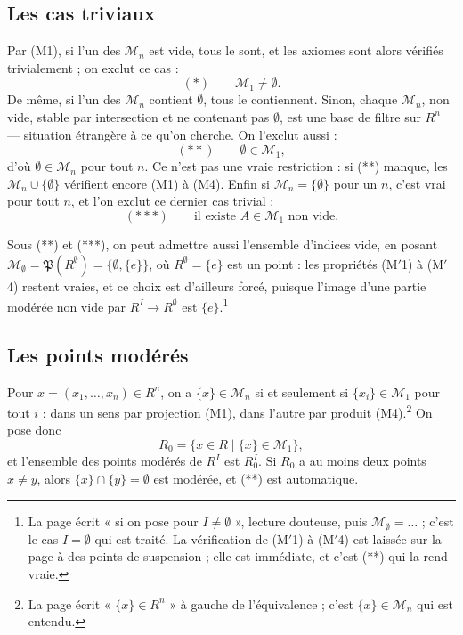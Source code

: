 \documentclass[11pt,a4paper]{article}
\begin{document}
\subsection*{Les cas triviaux}

Par (M1), si l'un des $\mathcal{M}_n$ est vide, tous le sont, et les axiomes
sont alors vérifiés trivialement ; on exclut ce cas :
\[ (*) \qquad \mathcal{M}_1 \neq \emptyset . \]
De même, si l'un des $\mathcal{M}_n$ contient $\emptyset$, tous le contiennent.
Sinon, chaque $\mathcal{M}_n$, non vide, stable par intersection et ne
contenant pas $\emptyset$, est une base de filtre sur $R^n$ — situation
étrangère à ce qu'on cherche. On l'exclut aussi :
\[ (**) \qquad \emptyset \in \mathcal{M}_1 , \]
d'où $\emptyset \in \mathcal{M}_n$ pour tout $n$. Ce n'est pas une vraie
restriction : si (**) manque, les $\mathcal{M}_n \cup \{\emptyset\}$ vérifient
encore (M1) à (M4). Enfin si $\mathcal{M}_n = \{\emptyset\}$ pour un $n$, c'est
vrai pour tout $n$, et l'on exclut ce dernier cas trivial :
\[ (***) \qquad \text{il existe } A \in \mathcal{M}_1 \text{ non vide.} \]

Sous (**) et (***), on peut admettre aussi l'ensemble d'indices vide, en posant
$\mathcal{M}_\emptyset = \mathfrak{P}(R^\emptyset) = \{\emptyset, \{e\}\}$, où
$R^\emptyset = \{e\}$ est un point : les propriétés (M$'$1) à (M$'$4) restent
vraies, et ce choix est d'ailleurs forcé, puisque l'image d'une partie
modérée non vide par $R^I \to R^\emptyset$ est $\{e\}$.\footnote{La page écrit
« si on pose pour $I \neq \emptyset$ », lecture douteuse, puis
$\mathcal{M}_\emptyset = \ldots$ ; c'est le cas $I = \emptyset$ qui est
traité. La vérification de (M$'$1) à (M$'$4) est laissée sur la page à des
points de suspension ; elle est immédiate, et c'est (**) qui la rend vraie.}

\subsection*{Les points modérés}

Pour $x = (x_1, \dots, x_n) \in R^n$, on a $\{x\} \in \mathcal{M}_n$ si et
seulement si $\{x_i\} \in \mathcal{M}_1$ pour tout $i$ : dans un sens par
projection (M1), dans l'autre par produit (M4).\footnote{La page écrit
« $\{x\} \in R^n$ » à gauche de l'équivalence ; c'est $\{x\} \in
\mathcal{M}_n$ qui est entendu.} On pose donc
\[ R_0 = \{x \in R \mid \{x\} \in \mathcal{M}_1\} , \]
et l'ensemble des points modérés de $R^I$ est $R_0^I$. Si $R_0$ a au moins
deux points $x \neq y$, alors $\{x\} \cap \{y\} = \emptyset$ est modérée, et
(**) est automatique.
\end{document}
